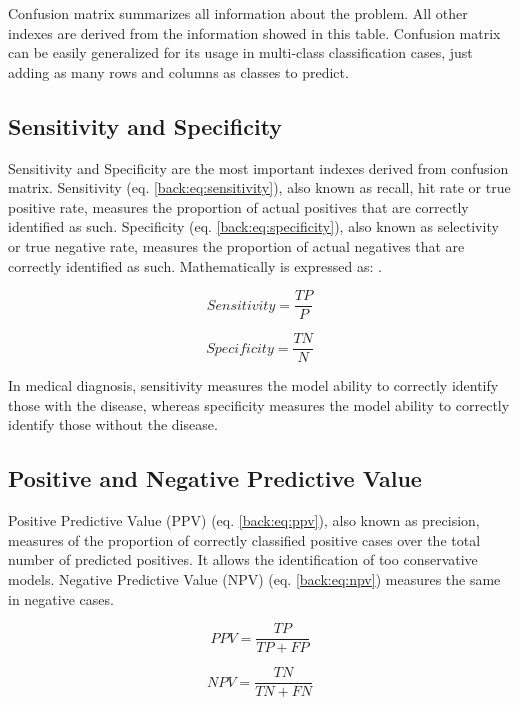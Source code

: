 Confusion matrix summarizes all information about the problem. All other indexes are derived from the information showed in this table. Confusion matrix can be easily generalized for its usage in multi-class classification cases, just adding as many rows and columns as classes to predict.

\subsection{Sensitivity and Specificity}

Sensitivity and Specificity are the most important indexes derived from confusion matrix.  Sensitivity (eq. \ref{back:eq:sensitivity}), also known as recall, hit rate or true positive rate, measures the proportion of actual positives that are correctly identified as such. Specificity (eq. \ref{back:eq:specificity}), also known as selectivity or true negative rate, measures the proportion of actual negatives that are correctly identified as such. Mathematically is expressed as: .

\begin{equation}
Sensitivity = \frac{TP}{P}
\label{back:eq:sensitivity}
\end{equation}

\begin{equation}
Specificity = \frac{TN}{N}
\label{back:eq:specificity}
\end{equation}

In medical diagnosis, sensitivity measures the model ability to correctly identify those with the disease, whereas specificity measures the model ability to correctly identify those without the disease. 

\subsection{Positive and Negative Predictive Value}

Positive Predictive Value (PPV) (eq. \ref{back:eq:ppv}), also known as precision, measures of the proportion of correctly classified positive cases over the total number of predicted positives. It allows the identification of too conservative models. Negative Predictive Value (NPV) (eq. \ref{back:eq:npv}) measures the same in negative cases.

\begin{equation}
PPV=\frac{TP}{TP+FP}
\label{back:eq:ppv}
\end{equation}

\begin{equation}
NPV=\frac{TN}{TN+FN}
\label{back:eq:npv}
\end{equation}



